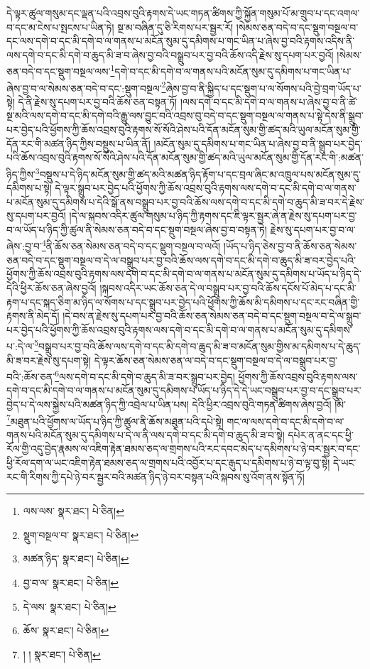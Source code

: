 དེ་ལྟར་ཚུལ་གསུམ་དང་ལྡན་པའི་འབྲས་བུའི་རྟགས་དེ་ཡང་གཏན་ཚིགས་ཀྱི་སྐྱོན་གསུམ་པོ་མ་གྲུབ་པ་དང་འགལ་བ་དང་མ་ངེས་པ་སྤངས་པ་ཡིན་ཏེ། སྔ་མ་བཞིན་དུ་ཅི་རིགས་པར་སྦྱར་རོ། །སེམས་ཅན་བདེ་བ་དང་སྡུག་བསྔལ་བ་དང་ལས་དགེ་བ་དང་མི་དགེ་བ་ལ་གནས་པ་མངོན་སུམ་དུ་དམིགས་པ་གང་ཡིན་པ་ཞེས་བྱ་བའི་རྟགས་འདིས་ནི་ལས་དགེ་བ་དང་མི་དགེ་བ་ཆུད་མི་ཟ་བ་ཞེས་བྱ་བའི་བསྒྲུབ་པར་བྱ་བའི་ཆོས་འདི་རྗེས་སུ་དཔག་པར་བྱའོ། །སེམས་ཅན་བདེ་བ་དང་སྡུག་བསྔལ་ལས་\footnote{ལས་ལས་  སྣར་ཐང་།  པེ་ཅིན། }དགེ་བ་དང་མི་དགེ་བ་ལ་གནས་པའི་མངོན་སུམ་དུ་དམིགས་པ་གང་ཡིན་པ་ཞེས་བྱ་བ་ལ་སེམས་ཅན་བདེ་བ་དང་:སྡུག་བསྔལ་\footnote{སྡུག་བསྔལ་བ་  སྣར་ཐང་།  པེ་ཅིན། }ཞེས་བྱ་བ་ནི་སྐྱིད་པ་དང་སྡུག་པ་ལ་སོགས་པའི་བྱེ་བྲག་ཡོད་པ་སྟེ། དེ་ནི་རྗེས་སུ་དཔག་པར་བྱ་བའི་ཆོས་ཅན་བསྟན་ཏོ། །ལས་དགེ་བ་དང་མི་དགེ་བ་ལ་གནས་པ་ཞེས་བྱ་བ་ནི་ཚེ་སྔ་མའི་ལས་དགེ་བ་དང་མི་དགེ་བའི་རྒྱུ་ལས་བྱུང་བའི་འབྲས་བུ་བདེ་བ་དང་སྡུག་བསྔལ་ལ་གནས་པ་སྟེ་དེས་ནི་སྒྲུབ་པར་བྱེད་པའི་ཕྱོགས་ཀྱི་ཆོས་འབྲས་བུའི་རྟགས་སོ་སོའི་ཤེས་པའི་དོན་མངོན་སུམ་གྱི་ཚད་མའི་ཡུལ་མངོན་སུམ་གྱི་དོན་རང་གི་མཚན་ཉིད་ཀྱིས་བསྡུས་པ་ཡིན་ནོ། །མངོན་སུམ་དུ་དམིགས་པ་གང་ཡིན་པ་ཞེས་བྱ་བ་ནི་སྒྲུབ་པར་བྱེད་པའི་ཆོས་འབྲས་བུའི་རྟགས་སོ་སོའི་ཤེས་པའི་དོན་མངོན་སུམ་གྱི་ཚད་མའི་ཡུལ་མངོན་སུམ་གྱི་དོན་རང་གི་:མཚན་ཉིད་ཀྱིས་\footnote{མཚན་ཉིད་  སྣར་ཐང་།  པེ་ཅིན། }བསྡུས་པ་དེ་ཉིད་མངོན་སུམ་གྱི་ཚད་མའི་མཚན་ཉིད་རྟོག་པ་དང་བྲལ་ཞིང་མ་འཁྲུལ་པས་མངོན་སུམ་དུ་དམིགས་པ་སྟེ། དེ་ལྟར་སྒྲུབ་པར་བྱེད་པའི་ཕྱོགས་ཀྱི་ཆོས་འབྲས་བུའི་རྟགས་ལས་དགེ་བ་དང་མི་དགེ་བ་ལ་གནས་པ་མངོན་སུམ་དུ་དམིགས་པ་དེའི་སྒོ་ནས་བསྒྲུབ་པར་བྱ་བའི་ཆོས་ལས་དགེ་བ་དང་མི་དགེ་བ་ཆུད་མི་ཟ་བར་དེ་རྗེས་སུ་དཔག་པར་བྱའོ། །དེ་ལ་སྐབས་འདིར་ཚུལ་གསུམ་པ་ཉིད་ཀྱི་རྟགས་དང་ཇི་ལྟར་སྦྱར་ཞེ་ན་རྗེས་སུ་དཔག་པར་བྱ་བ་ལ་ཡོད་པ་ཉིད་ཀྱི་ཚུལ་ནི་སེམས་ཅན་བདེ་བ་དང་སྡུག་བསྔལ་ཞེས་བྱ་བ་བསྟན་ཏེ། རྗེས་སུ་དཔག་པར་བྱ་བ་ལ་ཞེས་:བྱ་བ་\footnote{བྱ་བ་ལ་  སྣར་ཐང་།  པེ་ཅིན། }ནི་ཆོས་ཅན་སེམས་ཅན་བདེ་བ་དང་སྡུག་བསྔལ་བ་ལའོ། །ཡོད་པ་ཉིད་ཅེས་བྱ་བ་ནི་ཆོས་ཅན་སེམས་ཅན་བདེ་བ་དང་སྡུག་བསྔལ་བ་དེ་ལ་བསྒྲུབ་པར་བྱ་བའི་ཆོས་ལས་དགེ་བ་དང་མི་དགེ་བ་ཆུད་མི་ཟ་བར་བྱེད་པའི་ཕྱོགས་ཀྱི་ཆོས་འབྲས་བུའི་རྟགས་ལས་དགེ་བ་དང་མི་དགེ་བ་ལ་གནས་པ་མངོན་སུམ་དུ་དམིགས་པ་ཡོད་པ་ཉིད་དེ་དེའི་ཕྱིར་ཆོས་ཅན་ཞེས་བྱའོ། །སྐབས་འདིར་ཡང་ཆོས་ཅན་དེ་ལ་བསྒྲུབ་པར་བྱ་བའི་ཆོས་དངོས་པོ་མེད་པ་དང་མི་རྟག་པ་དང་སྐད་ཅིག་མ་ཉིད་ལ་སོགས་པ་དང་སྒྲུབ་པར་བྱེད་པའི་ཕྱོགས་ཀྱི་ཆོས་མི་དམིགས་པ་དང་རང་བཞིན་གྱི་རྟགས་ནི་མེད་དོ། །དེ་བས་ན་རྗེས་སུ་དཔག་པར་བྱ་བའི་ཆོས་ཅན་སེམས་ཅན་བདེ་བ་དང་སྡུག་བསྔལ་བ་དེ་ལ་སྒྲུབ་པར་བྱེད་པའི་ཕྱོགས་ཀྱི་ཆོས་འབྲས་བུའི་རྟགས་ལས་དགེ་བ་དང་མི་དགེ་བ་ལ་གནས་པ་མངོན་སུམ་དུ་དམིགས་པ་:དེ་ལ་\footnote{དེ་ལས་  སྣར་ཐང་།  པེ་ཅིན། }བསྒྲུབ་པར་བྱ་བའི་ཆོས་ལས་དགེ་བ་དང་མི་དགེ་བ་ཆུད་མི་ཟ་བ་མངོན་སུམ་གྱིས་མ་དམིགས་པ་དེ་ཆུད་མི་ཟ་བར་རྗེས་སུ་དཔག་སྟེ། དེ་ལྟར་ཆོས་ཅན་སེམས་ཅན་ལ་བདེ་བ་དང་སྡུག་བསྔལ་བ་དེ་ལ་བསྒྲུབ་པར་བྱ་བའི་:ཆོས་ཅན་\footnote{ཆོས་  སྣར་ཐང་།  པེ་ཅིན། }ལས་དགེ་བ་དང་མི་དགེ་བ་ཆུད་མི་ཟ་བར་སྒྲུབ་པར་བྱེད། ཕྱོགས་ཀྱི་ཆོས་འབྲས་བུའི་རྟགས་ལས་དགེ་བ་དང་མི་དགེ་བ་ལ་གནས་པ་མངོན་སུམ་དུ་དམིགས་པ་ཡོད་པ་ཉིད་དེ་དེ་ཡང་བསྒྲུབ་པར་བྱ་བ་དང་སྒྲུབ་པར་བྱེད་པ་དེ་ལས་སྐྱེས་པའི་མཚན་ཉིད་ཀྱི་འབྲེལ་པ་ཡིན་པས། དེའི་ཕྱིར་འབྲས་བུའི་གཏན་ཚིགས་ཞེས་བྱའོ། །མི་\footnote{། །  སྣར་ཐང་།  པེ་ཅིན། }མཐུན་པའི་ཕྱོགས་ལ་ཡོད་པ་ཉིད་ཀྱི་ཚུལ་ནི་ཆོས་མཐུན་པའི་དཔེ་སྟེ། གང་ལ་ལས་དགེ་བ་དང་མི་དགེ་བ་ལ་གནས་པའི་མངོན་སུམ་དུ་དམིགས་པ་དེ་ལ་ནི་ལས་དགེ་བ་དང་མི་དགེ་བ་ཆུད་མི་ཟ་བ་སྟེ། དཔེར་ན་ནང་དང་ཕྱི་རོལ་གྱི་འདུ་བྱེད་རྣམས་ལ་འཇིག་རྟེན་ཐམས་ཅད་ལ་གྲགས་པའི་རང་དབང་མེད་པ་དམིགས་པ་ཉེ་བར་སྦྱར་བ་དང་ཕྱི་རོལ་དག་ལ་ཡང་འཇིག་རྟེན་ཐམས་ཅད་ལ་གྲགས་པའི་འབྱོར་པ་དང་རྒུད་པ་དམིགས་པ་ཉེ་བ་ལྟ་བུ་སྟེ། དེ་ཡང་རང་གི་རིགས་ཀྱི་དཔེ་ཉེ་བར་སྦྱར་བའི་མཚན་ཉིད་ཉེ་བར་བསྟན་པའི་སྐབས་སུ་འོག་ནས་སྟོན་ཏོ། 